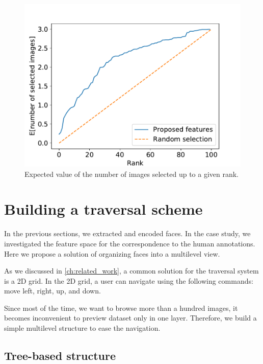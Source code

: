 \begin{figure}
    \centering
    \includegraphics[width=0.8\linewidth]{graphs/survey_cumsum_without_the_easy.pdf}
    \caption{Expected value of the number of images selected up to a given rank.}
    \label{fig:random_selection_faces}
\end{figure}

\section{Building a traversal scheme}

In the previous sections, we extracted and encoded faces. In the case study, we investigated the feature space for the correspondence to the human annotations. Here we propose a solution of organizing faces into a multilevel view. 

As we discussed in \autoref{ch:related_work}, a common solution for the traversal system is a 2D grid.  In the 2D grid, a user can navigate using the following commands: move left, right, up, and down.



Since most of the time, we want to browse more than a hundred images, it becomes inconvenient to preview dataset only in one layer. Therefore, we build a simple multilevel structure to ease the navigation.

\subsection{Tree-based structure}

